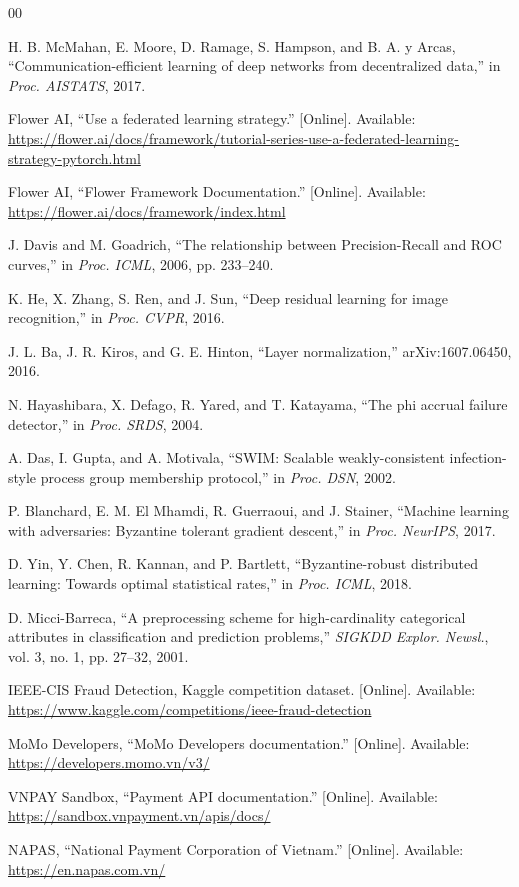 \documentclass[conference]{IEEEtran}
\begin{document}
\begin{thebibliography}{00}

H. B. McMahan, E. Moore, D. Ramage, S. Hampson, and B. A. y Arcas,
``Communication-efficient learning of deep networks from decentralized data,''
in \emph{Proc. AISTATS}, 2017.

Flower AI, ``Use a federated learning strategy.'' [Online]. Available:
\url{https://flower.ai/docs/framework/tutorial-series-use-a-federated-learning-strategy-pytorch.html}

Flower AI, ``Flower Framework Documentation.'' [Online]. Available:
\url{https://flower.ai/docs/framework/index.html}

J. Davis and M. Goadrich, ``The relationship between Precision-Recall and ROC
curves,'' in \emph{Proc. ICML}, 2006, pp. 233--240.

K. He, X. Zhang, S. Ren, and J. Sun, ``Deep residual learning for image
recognition,'' in \emph{Proc. CVPR}, 2016.

J. L. Ba, J. R. Kiros, and G. E. Hinton, ``Layer normalization,''
arXiv:1607.06450, 2016.

N. Hayashibara, X. Defago, R. Yared, and T. Katayama, ``The phi accrual
failure detector,'' in \emph{Proc. SRDS}, 2004.

A. Das, I. Gupta, and A. Motivala, ``SWIM: Scalable weakly-consistent
infection-style process group membership protocol,'' in \emph{Proc. DSN}, 2002.

P. Blanchard, E. M. El Mhamdi, R. Guerraoui, and J. Stainer, ``Machine learning
with adversaries: Byzantine tolerant gradient descent,'' in \emph{Proc.
NeurIPS}, 2017.

D. Yin, Y. Chen, R. Kannan, and P. Bartlett, ``Byzantine-robust distributed
learning: Towards optimal statistical rates,'' in \emph{Proc. ICML}, 2018.

D. Micci-Barreca, ``A preprocessing scheme for high-cardinality categorical
attributes in classification and prediction problems,'' \emph{SIGKDD Explor.
Newsl.}, vol. 3, no. 1, pp. 27--32, 2001.

IEEE-CIS Fraud Detection, Kaggle competition dataset. [Online]. Available:
\url{https://www.kaggle.com/competitions/ieee-fraud-detection}

MoMo Developers, ``MoMo Developers documentation.'' [Online]. Available:
\url{https://developers.momo.vn/v3/}

VNPAY Sandbox, ``Payment API documentation.'' [Online]. Available:
\url{https://sandbox.vnpayment.vn/apis/docs/}

NAPAS, ``National Payment Corporation of Vietnam.'' [Online]. Available:
\url{https://en.napas.com.vn/}

\end{thebibliography}
\end{document}
